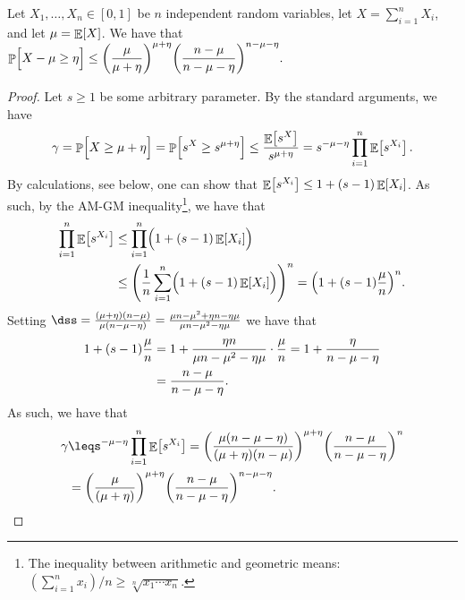 \begin{theorem}
    Let $X_1, \ldots, X_n \in [0,1]$ be $n$ independent random
    variables, let $X = \sum_{i=1}^n X_i$, and let $\mu = \mathop{\mathbb{E}}\!\left[ {X} \right]$. We
    have that
    \begin{math}
        \ds%
        \Prob{\Bigl.X - \mu \geq \eta }%
        \leq%
        \pth{ \frac{\mu}{\mu + \eta} }^{\mu + \eta} %
        \pth{ \frac{n - \mu}{ n - \mu - \eta} }^{n - \mu - \eta}.
    \end{math}
\end{theorem}
\begin{proof}
    Let $s\geq 1$ be some arbitrary parameter. By the standard
    arguments, we have
    \begin{align*}
        \gamma%
        =%
        \Prob{\Bigl. X \geq \mu + \eta } %
        =%
        \Prob{\Bigl. s^X \geq s^{\mu + \eta} } %
        \leq%
        \frac{\Ex{s^X}}{s^{\mu + \eta}}%
        =%
        s^{-\mu - \eta} \prod_{i=1}^n \Ex{s^{X_i}}.
    \end{align*}
    By calculations, see  below, one can show that
    $\mathop{\mathbb{E}}\!\left[ {s^{X_i}} \right] \leq 1 + (s-1)\mathop{\mathbb{E}}\!\left[ {X_i} \right]$. As such, by the AM-GM
    inequality\footnote{The inequality between arithmetic and
       geometric means:\hfill\break
       $(\sum_{i=1}^n x_i) /n \geq \sqrt[n]{x_1\cdots x_n}$.}, we have
    that
    \begin{align*}
        \prod_{i=1}^n \Ex{s^{X_i}}%
        &\leq%
        \prod_{i=1}^n \pth{\Bigl. 1 + (s-1)\Ex{X_i}}%
        \\&\leq%
        \pth{\frac{1}{n}\sum_{i=1}^n \pth{\Bigl. 1 +
              (s-1)\Ex{X_i}}}^n%
        =%
        \pth{1 + (s-1) \frac{\mu}{n}}^n.
    \end{align*}
    Setting
    \begin{math}
        \ds%
        s%
        =%
        \frac{ (\mu + \eta )(n-\mu)}{\mu(n-\mu - \eta)}%
        =%
        \frac{ \mu n - \mu^2 +\eta n - \eta \mu}{\mu n - \mu^2 -
           \eta\mu }%
    \end{math}
    we have that
    \begin{align*}
        \ds%
        1 + (s-1)\frac{\mu}{n}%
        &=%
        1 +%
        \frac{\eta n}{\mu n - \mu^2 - \eta\mu } \cdot \frac{\mu}{n}%
        =%
        1 +%
        \frac{\eta }{n - \mu - \eta } %
        \\&=%
        \frac{ n- \mu}{n-\mu - \eta}.
    \end{align*}
    As such, we have that
    \begin{align*}
        \gamma%
        &\leq%
        s^{-\mu - \eta} \prod_{i=1}^n \Ex{s^{X_i}}%
        =%
        \pth{\frac{\mu(n-\mu - \eta)}{ (\mu + \eta )(n-\mu)}}^{\mu +
           \eta} \pth{\frac{ n- \mu}{n-\mu - \eta}}^n%
        \\&%
        =%
        \pth{\frac{\mu}{ (\mu + \eta )}}^{\mu + \eta} \pth{\frac{ n-
              \mu}{n-\mu - \eta}}^{n-\mu -\eta}.
    \end{align*}
\end{proof}

